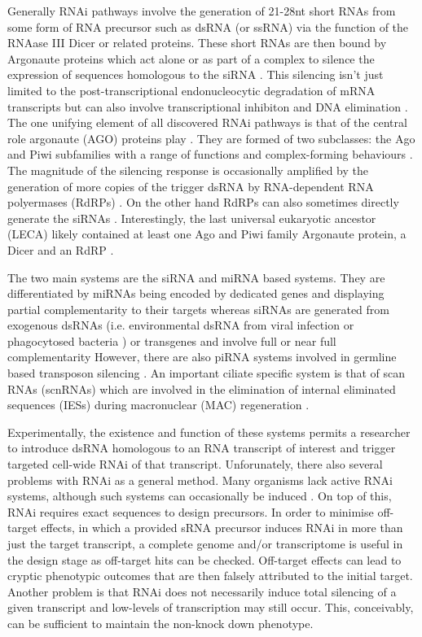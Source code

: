 Generally RNAi pathways involve the generation of 21-28nt short RNAs
from some form of RNA precursor such as dsRNA (or ssRNA)
via the function of the RNAase III Dicer \citep{Bernstein2001} or related proteins.
These short RNAs are then bound by Argonaute proteins which act alone or as part
of a complex to silence the expression of sequences homologous to the siRNA \citep{Ketting2011}.
This silencing isn't just limited to the post-transcriptional endonucleocytic degradation of 
mRNA transcripts but can also involve transcriptional inhibiton and
DNA elimination \citep{Marker2014}.
The one unifying element of all discovered RNAi pathways is that
of the central role argonaute (AGO) proteins play \citep{Ketting2011}.
They are formed of two subclasses: the Ago and Piwi subfamilies \citep{Peters2007}
with a range of functions and complex-forming behaviours
\citep{Ender2010}.
The magnitude of the silencing response is occasionally amplified by the generation
of more copies of the trigger dsRNA by RNA-dependent RNA polyermases (RdRPs) \citep{Arp2007}.
On the other hand RdRPs can also sometimes directly generate the siRNAs \citep{Aoki2007,Ketting2011}.
Interestingly, the last universal eukaryotic ancestor (LECA) likely contained 
at least one Ago and Piwi family Argonaute protein, a Dicer and an RdRP \citep{Cerutti2006}.

The two main systems are the siRNA and miRNA based systems.  They are differentiated
by miRNAs being encoded by dedicated genes and displaying partial
complementarity to their targets whereas siRNAs are generated from exogenous
dsRNAs (i.e. environmental dsRNA from viral infection or phagocytosed bacteria \citep{Whangbo2008})
or transgenes and involve full or near full complementarity \citep{Shabalina2008}
However, there are also piRNA systems involved in germline based transposon silencing \citep{Iwasaki2015}.
An important ciliate specific system is that of scan RNAs (scnRNAs) which 
are involved in the elimination of internal eliminated sequences (IESs) during
macronuclear (MAC) regeneration \citep{Mochizuki2004,Chalker2013}.


Experimentally, the existence and function of these systems
permits a researcher to introduce dsRNA homologous to an RNA transcript of interest
and trigger targeted cell-wide RNAi of that transcript.
Unforunately, there also several problems with RNAi as a general method.
Many organisms lack active RNAi systems, although such systems can occasionally
be induced \citep{Alibu2005}.
On top of this, RNAi requires exact sequences to design precursors.
In order to minimise off-target effects, in which a provided sRNA precursor induces RNAi
in more than just the target transcript, a complete genome and/or transcriptome
is useful in the design stage as off-target hits can be checked. 
Off-target effects  can lead to cryptic
phenotypic outcomes that are then falsely attributed to the initial target.
Another problem is that RNAi does not necessarily induce total silencing
of a given transcript and low-levels of transcription may still occur.
This, conceivably, can be sufficient to maintain the non-knock down phenotype.

